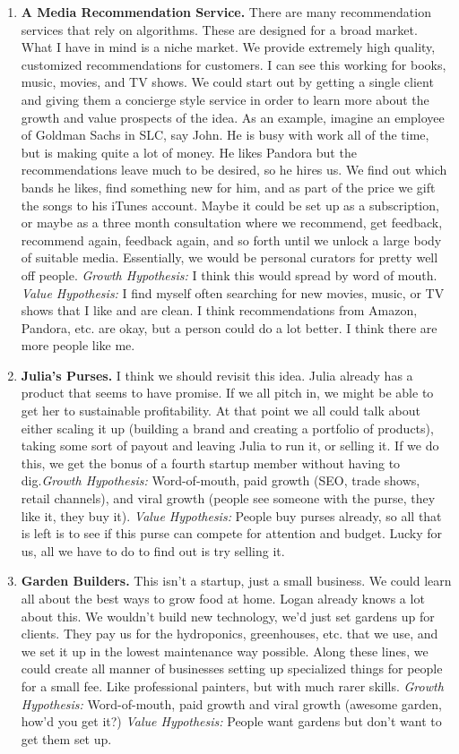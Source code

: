 \documentclass[paper=a4, fontsize=11pt]{scrartcl} %
\numberwithin{equation}{section} %
\numberwithin{figure}{section} %
\numberwithin{table}{section} %
\begin{document}
\begin{enumerate}
\item \textbf{A Media Recommendation Service.}  There are many recommendation services that rely on algorithms.  These are designed for a broad market.  What I have in mind is a niche market.  We provide extremely high quality, customized recommendations for customers.  I can see this working for books, music, movies, and TV shows.  We could start out by getting a single client and giving them a concierge style service in order to learn more about the growth and value prospects of the idea.  As an example, imagine an employee of Goldman Sachs in SLC, say John.  He is busy with work all of the time, but is making quite a lot of money.  He likes Pandora but the recommendations leave much to be desired, so he hires us.  We find out which bands he likes, find something new for him, and as part of the price we gift the songs to his iTunes account.  Maybe it could be set up as a subscription, or maybe as a three month consultation where we recommend, get feedback, recommend again, feedback again, and so forth until we unlock a large body of suitable media.  Essentially, we would be personal curators for pretty well off people. \textit{Growth Hypothesis:}  I think this would spread by word of mouth.  \textit{Value Hypothesis:}  I find myself often searching for new movies, music, or TV shows that I like and are clean.  I think recommendations from Amazon, Pandora, etc. are okay, but a person could do a lot better.  I think there are more people like me.


\item \textbf{Julia's Purses.}  I think we should revisit this idea.  Julia already has a product that seems to have promise.  If we all pitch in, we might be able to get her to sustainable profitability.  At that point we all could talk about either scaling it up (building a brand and creating a portfolio of products), taking some sort of payout and leaving Julia to run it, or selling it.  If we do this, we get the bonus of a fourth startup member without having to dig.\textit{Growth Hypothesis:}  Word-of-mouth, paid growth (SEO, trade shows, retail channels), and viral growth (people see someone with the purse, they like it, they buy it).  \textit{Value Hypothesis:}  People buy purses already, so all that is left is to see if this purse can compete for attention and budget.  Lucky for us, all we have to do to find out is try selling it.


\item \textbf{Garden Builders.}  This isn't a startup, just a small business. We could learn all about the best ways to grow food at home.  Logan already knows a lot about this.  We wouldn't build new technology, we'd just set gardens up for clients.  They pay us for the hydroponics, greenhouses, etc. that we use, and we set it up in the lowest maintenance way possible.  Along these lines, we could create all manner of businesses setting up specialized things for people for a small fee.  Like professional painters, but with much rarer skills.  \textit{Growth Hypothesis:}  Word-of-mouth, paid growth and viral growth (awesome garden, how'd you get it?)  \textit{Value Hypothesis:}  People want gardens but don't want to get them set up.


\end{enumerate}
\end{document}
